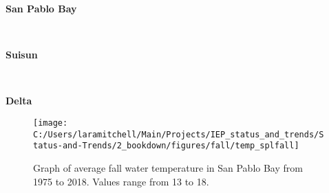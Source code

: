 \documentclass[
]{book}
\begin{document}
\begin{panel-grid}

\begin{columns-nocenter}

\begin{column800}

\textbf{San Pablo Bay}

\end{column800}

\begin{column40}

~

\end{column40}

\begin{column800}

\textbf{Suisun}

\end{column800}

\begin{column40}

~

\end{column40}

\begin{column800}

\textbf{Delta}

\end{column800}

\end{columns-nocenter}

\begin{columns-nocenter}

\begin{column800}

\begin{expand}

\begin{figure}
\texttt{[image: C:/Users/laramitchell/Main/Projects/IEP\_status\_and\_trends/Status-and-Trends/2\_bookdown/figures/fall/temp\_splfall]} \caption{Graph of average fall water temperature in San Pablo Bay from 1975 to 2018. Values range from 13 to 18.}\label{fig:unnamed-chunk-102}
\end{figure}

\end{expand}

\end{column800}

\begin{column40}

~


\end{column40}
\end{columns-nocenter}
\end{panel-grid}
\end{document}
